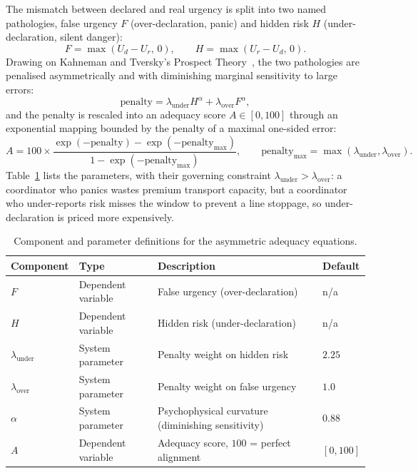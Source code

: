 The mismatch between declared and real urgency is split into two named pathologies, false urgency $F$ (over-declaration, panic) and hidden risk $H$ (under-declaration, silent danger):
\begin{equation}
    F = \max(U_d - U_r,\, 0), \qquad H = \max(U_r - U_d,\, 0).
    \label{eq:fh}
\end{equation}
Drawing on Kahneman and Tversky's Prospect Theory~\autocite{kahneman1979prospect}, the two pathologies are penalised asymmetrically and with diminishing marginal sensitivity to large errors:
\begin{equation}
    \text{penalty} = \lambda_{\text{under}} H^{\alpha} + \lambda_{\text{over}} F^{\alpha},
    \label{eq:penalty}
\end{equation}
and the penalty is rescaled into an adequacy score $A \in [0, 100]$ through an exponential mapping bounded by the penalty of a maximal one-sided error:
\begin{equation}
    A = 100 \times \frac{\exp(-\text{penalty}) - \exp(-\text{penalty}_{\max})}{1 - \exp(-\text{penalty}_{\max})}, \qquad \text{penalty}_{\max} = \max(\lambda_{\text{under}}, \lambda_{\text{over}}).
    \label{eq:At}
\end{equation}
Table~\ref{tab:adequation_components} lists the parameters, with their governing constraint $\lambda_{\text{under}} > \lambda_{\text{over}}$: a coordinator who panics wastes premium transport capacity, but a coordinator who under-reports risk misses the window to prevent a line stoppage, so under-declaration is priced more expensively.

\begin{table}[H]
\centering
\caption{Component and parameter definitions for the asymmetric adequacy equations.}
\label{tab:adequation_components}
\small
\begin{tabularx}{\linewidth}{llXl}
\toprule
\textbf{Component} & \textbf{Type} & \textbf{Description} & \textbf{Default} \\
\midrule
$F$ & Dependent variable & False urgency (over-declaration) & n/a \\
$H$ & Dependent variable & Hidden risk (under-declaration) & n/a \\
$\lambda_{\text{under}}$ & System parameter & Penalty weight on hidden risk & $2.25$ \\
$\lambda_{\text{over}}$ & System parameter & Penalty weight on false urgency & $1.0$ \\
$\alpha$ & System parameter & Psychophysical curvature (diminishing sensitivity) & $0.88$ \\
$A$ & Dependent variable & Adequacy score, $100$ = perfect alignment & $[0,100]$ \\
\bottomrule
\end{tabularx}
\end{table}

